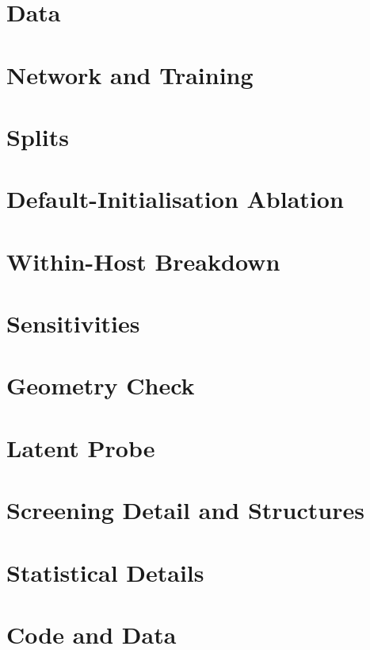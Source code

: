 \section{Data}
\label{app:data}

\section{Network and Training}
\label{app:network}

\section{Splits}
\label{app:splits}

\section{Default-Initialisation Ablation}
\label{app:ablation}

\section{Within-Host Breakdown}
\label{app:within}

\section{Sensitivities}
\label{app:sens}

\section{Geometry Check}
\label{app:geometry}

\section{Latent Probe}
\label{app:probe}

\section{Screening Detail and Structures}
\label{app:screening}

\section{Statistical Details}
\label{app:stats}

\section{Code and Data}
\label{app:code}
